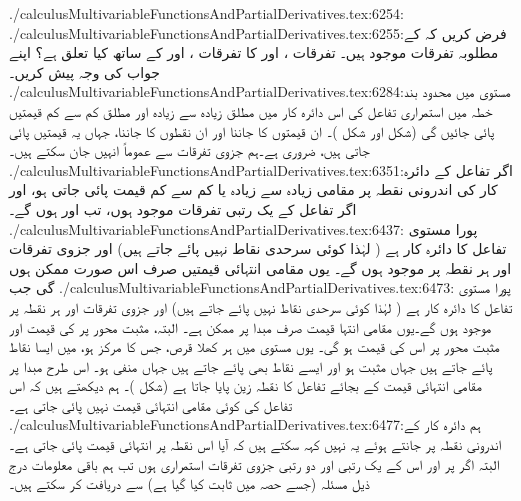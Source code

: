 ./calculusMultivariableFunctionsAndPartialDerivatives.tex:6254:\\
./calculusMultivariableFunctionsAndPartialDerivatives.tex:6255:فرض کریں کہ  کے مطلوبہ تفرقات موجود ہیں۔ تفرقات ،  اور  کا تفرقات ،  اور  کے ساتھ کیا تعلق ہے؟ اپنے جواب کی وجہ پیش کریں۔
./calculusMultivariableFunctionsAndPartialDerivatives.tex:6284:مستوی  میں محدود   بند خطہ میں استمراری تفاعل  کی اس دائرہ کار میں مطلق زیادہ سے زیادہ اور مطلق کم سے کم قیمتیں پائی جائیں گی (شکل  اور شکل )۔ ان قیمتوں  کا جاننا اور ان نقطوں کا  جاننا،   جہاں یہ قیمتیں پائی جاتی ہیں،  ضروری ہے۔ہم جزوی تفرقات  سے  عموماً انہیں جان سکتے ہیں۔
./calculusMultivariableFunctionsAndPartialDerivatives.tex:6351:اگر تفاعل  کے دائرہ کار کی اندرونی نقطہ  پر مقامی زیادہ سے زیادہ یا کم سے کم  قیمت پائی جاتی ہو، اور اگر تفاعل کے  یک رتبی تفرقات  موجود ہوں، تب  اور  ہوں گے۔ 
./calculusMultivariableFunctionsAndPartialDerivatives.tex:6437: پورا مستوی  تفاعل  کا دائرہ کار  ہے ( لہٰذا کوئی سرحدی نقاط نہیں پائے جاتے ہیں) اور جزوی تفرقات  اور  ہر  نقطہ پر موجود ہوں گے۔ یوں مقامی انتہائی قیمتیں صرف اس صورت ممکن ہوں گی جب 
./calculusMultivariableFunctionsAndPartialDerivatives.tex:6473: پورا مستوی  تفاعل  کا دائرہ کار   ہے ( لہٰذا کوئی سرحدی نقاط نہیں پائے جاتے ہیں) اور جزوی تفرقات  اور  ہر  نقطہ پر موجود ہوں گے۔یوں مقامی انتہا قیمت صرف مبدا پر ممکن ہے۔ البتہ، مثبت  محور پر   کی قیمت  اور مثبت  محور پر اس کی قیمت  ہو گی۔ یوں  مستوی  میں ہر  کھلا قرص، جس کا مرکز   ہو، میں  ایسا نقاط پائے جاتے ہیں جہاں  مثبت ہو اور ایسے نقاط بھی پائے جاتے ہیں جہاں  منفی ہو۔  اس طرح مبدا پر مقامی انتہائی قیمت کے بجائے  تفاعل کا نقطہ زین پایا جاتا ہے (شکل )۔ ہم دیکھتے ہیں کہ اس تفاعل کی  کوئی مقامی انتہائی قیمت نہیں پائی جاتی ہے۔
./calculusMultivariableFunctionsAndPartialDerivatives.tex:6477:ہم  دائرہ کار  کے اندرونی نقطہ  پر   جانتے ہوئے یہ نہیں  کہہ سکتے ہیں کہ آیا اس نقطہ پر انتہائی قیمت پائی جاتی ہے۔ البتہ اگر  پر   اور اس کے یک رتبی اور دو رتبی  جزوی تفرقات استمراری ہوں  تب ہم باقی معلومات درج ذیل مسئلہ (جسے حصہ  میں ثابت کیا گیا ہے) سے دریافت کر سکتے ہیں۔
